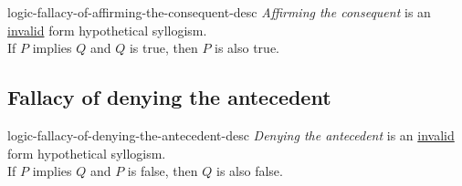 \documentclass[preview]{standalone}
\begin{document}
\begin{snippet}{logic-fallacy-of-affirming-the-consequent-desc}
\textit{Affirming the consequent}
is an \underline{invalid} form hypothetical syllogism. \\
If \(P\) implies \(Q\) and \(Q\) is true, then \(P\) is also true.
\end{snippet}


\subsection{Fallacy of denying the antecedent}

\begin{snippet}{logic-fallacy-of-denying-the-antecedent-desc}
\textit{Denying the antecedent}
is an \underline{invalid} form hypothetical syllogism. \\
If \(P\) implies \(Q\) and \(P\) is false, then \(Q\) is also false.
\end{snippet}

\end{document}
